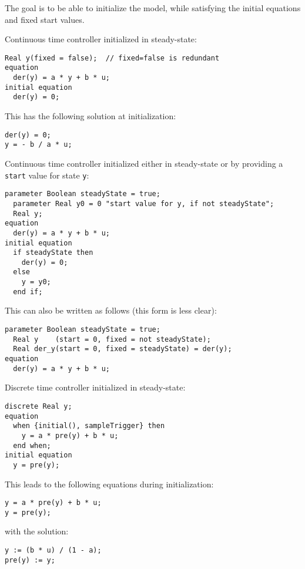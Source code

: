 \begin{nonnormative}
The goal is to be able to initialize the model, while satisfying the initial equations and fixed start values.
\end{nonnormative}

\begin{example}
Continuous time controller initialized in steady-state:
\begin{lstlisting}[language=modelica]
  Real y(fixed = false);  // fixed=false is redundant
equation
  der(y) = a * y + b * u;
initial equation
  der(y) = 0;
\end{lstlisting}

This has the following solution at initialization:
\begin{lstlisting}[language=modelica]
der(y) = 0;
y = - b / a * u;
\end{lstlisting}
\end{example}

\begin{example}
Continuous time controller initialized either in steady-state or by providing a \lstinline!start! value for state \lstinline!y!:
\begin{lstlisting}[language=modelica]
  parameter Boolean steadyState = true;
  parameter Real y0 = 0 "start value for y, if not steadyState";
  Real y;
equation
  der(y) = a * y + b * u;
initial equation
  if steadyState then
    der(y) = 0;
  else
    y = y0;
  end if;
\end{lstlisting}

This can also be written as follows (this form is less clear):
\begin{lstlisting}[language=modelica]
  parameter Boolean steadyState = true;
  Real y    (start = 0, fixed = not steadyState);
  Real der_y(start = 0, fixed = steadyState) = der(y);
equation
  der(y) = a * y + b * u;
\end{lstlisting}
\end{example}

\begin{example}
Discrete time controller initialized in steady-state:
\begin{lstlisting}[language=modelica]
  discrete Real y;
equation
  when {initial(), sampleTrigger} then
    y = a * pre(y) + b * u;
  end when;
initial equation
  y = pre(y);
\end{lstlisting}

This leads to the following equations during initialization:
\begin{lstlisting}[language=modelica]
y = a * pre(y) + b * u;
y = pre(y);
\end{lstlisting}
with the solution:
\begin{lstlisting}[language=modelica]
y := (b * u) / (1 - a);
pre(y) := y;
\end{lstlisting}
\end{example}

